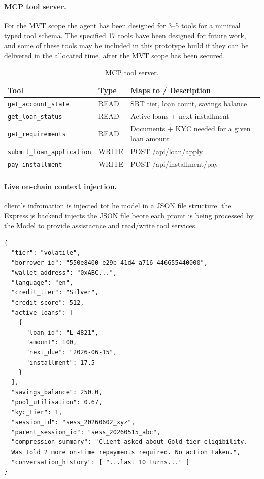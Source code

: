 \paragraph{MCP tool server.} For the MVT scope the agent has been designed for 3--5 tools for a minimal typed tool schema. The specified 17 tools have been designed for future work, and some of these tools may be included in this prototype build if they can be delivered in the allocated time, after the MVT scope has been secured.

\begin{table}[H]
\centering
\caption[MCP tool server]{MCP tool server.}
\label{tab:mcp-tools}
\begin{tabular}{p{4.8cm}p{1.4cm}p{6.3cm}}
\toprule
\tableheadcolor
\textbf{Tool} & \textbf{Type} & \textbf{Maps to / Description} \\
\midrule
\texttt{get\_account\_state}       & READ & SBT tier, loan count, savings balance \\
\texttt{get\_loan\_status}         & READ & Active loans + next installment \\
\texttt{get\_requirements}         & READ & Documents + KYC needed for a given loan amount \\
\texttt{submit\_loan\_application} & WRITE & POST /api/loan/apply \\
\texttt{pay\_installment}          & WRITE & POST /api/installment/pay \\
\bottomrule
\end{tabular}
\end{table}

\paragraph{Live on-chain context injection.}
client's infromation is injected tot he model in a JSON file structure. the Express.js backend injects the JSON file beore each promt is being processed by the Model to provide assistacnce and read/write tool services.
\begin{verbatim}
{
  "tier": "volatile",
  "borrower_id": "550e8400-e29b-41d4-a716-446655440000",
  "wallet_address": "0xABC...",
  "language": "en",
  "credit_tier": "Silver",
  "credit_score": 512,
  "active_loans": [
    {
      "loan_id": "L-4821",
      "amount": 100,
      "next_due": "2026-06-15",
      "installment": 17.5
    }
  ],
  "savings_balance": 250.0,
  "pool_utilisation": 0.67,
  "kyc_tier": 1,
  "session_id": "sess_20260602_xyz",
  "parent_session_id": "sess_20260515_abc",
  "compression_summary": "Client asked about Gold tier eligibility.
  Was told 2 more on-time repayments required. No action taken.",
  "conversation_history": [ "...last 10 turns..." ]
}
\end{verbatim}

